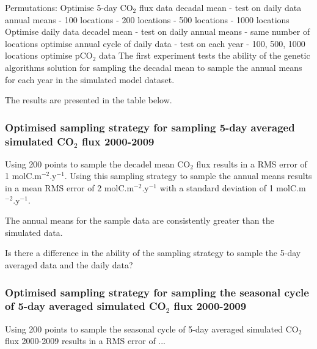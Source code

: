 \documentclass[11pt, a4paper]{article}
\numberwithin{figure}{section}
\numberwithin{table}{section}
\begin{document}
        Permutations:
        Optimise 5-day CO$_2$ flux data decadal mean
         - test on daily data annual means
            - 100 locations
            - 200 locations
            - 500 locations
            - 1000 locations
        Optimise daily data decadel mean
         - test on daily annual means
         - same number of locations
        optimise annual cycle of daily data
         - test on each year 
         - 100, 500, 1000 locations
        optimise pCO$_2$ data
The first experiment tests the ability of the genetic algorithms solution
for sampling the decadal mean to sample the annual means for each year in the simulated
model dataset.

The results are presented in the table below.
        
        \subsubsection{Optimised sampling strategy for sampling 
        5-day averaged simulated CO$_2$ flux 2000-2009} 
        Using 200 points to sample the decadel mean CO$_2$ flux 
        results in a RMS error of 1 molC.m$^{-2}$.y$^{-1}$. Using this
        sampling strategy to sample the annual means results in a
        mean RMS error of 2 molC.m$^{-2}$.y$^{-1}$ with a standard
        deviation of 1 molC.m$^{-2}$.y$^{-1}$. 

        The annual means for the sample data are consistently greater
        than the simulated data. 

        Is there a difference in the ability of the sampling strategy
        to sample the 5-day averaged data and the daily data?

        \subsubsection{Optimised sampling strategy for sampling the
        seasonal cycle of 5-day averaged simulated CO$_2$ flux 2000-2009} 
        Using 200 points to sample the seasonal cycle of 5-day averaged 
        simulated CO$_2$ flux 2000-2009 results in a RMS error of ...
\end{document}
